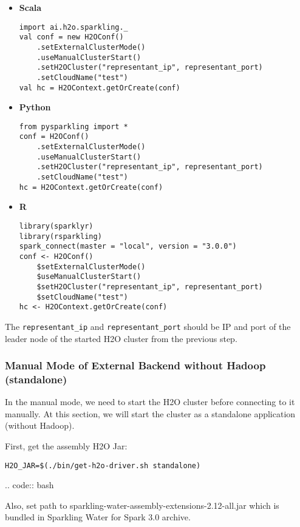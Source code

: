 \begin{itemize}
    \item \textbf{Scala} \begin{lstlisting}[style=Scala]
import ai.h2o.sparkling._
val conf = new H2OConf()
    .setExternalClusterMode()
    .useManualClusterStart()
    .setH2OCluster("representant_ip", representant_port)
    .setCloudName("test")
val hc = H2OContext.getOrCreate(conf)
    \end{lstlisting}
    \item \textbf{Python} \begin{lstlisting}[style=Python]
from pysparkling import *
conf = H2OConf()
    .setExternalClusterMode()
    .useManualClusterStart()
    .setH2OCluster("representant_ip", representant_port)
    .setCloudName("test")
hc = H2OContext.getOrCreate(conf)
    \end{lstlisting}
    \item \textbf{R} \begin{lstlisting}[style=R]
library(sparklyr)
library(rsparkling)
spark_connect(master = "local", version = "3.0.0")
conf <- H2OConf()
    $setExternalClusterMode()
    $useManualClusterStart()
    $setH2OCluster("representant_ip", representant_port)
    $setCloudName("test")
hc <- H2OContext.getOrCreate(conf)
    \end{lstlisting}
\end{itemize}


The \texttt{representant\_ip} and \texttt{representant\_port} should be IP and port of the leader node of the started
H2O cluster from the previous step.

\subsubsection{Manual Mode of External Backend without Hadoop (standalone)}

In the manual mode, we need to start the H2O cluster before connecting to it manually. At this section, we will start
the cluster as a standalone application (without Hadoop).

First, get the assembly H2O Jar:

\begin{lstlisting}[style=bash]
H2O_JAR=$(./bin/get-h2o-driver.sh standalone)
\end{lstlisting}

.. code:: bash


Also, set path to sparkling-water-assembly-extensions-2.12-all.jar which is bundled in Sparkling Water for Spark 3.0 archive.

